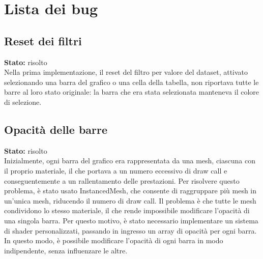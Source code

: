 \section{Lista dei bug}
\subsection{Reset dei filtri}
\textbf{Stato:} risolto\\
Nella prima implementazione, il reset del filtro per valore del dataset,
attivato selezionando una barra del grafico o una cella della tabella,
non riportava tutte le barre al loro stato originale: la barra che era
stata selezionata manteneva il colore di selezione.

\subsection{Opacità delle barre}
\textbf{Stato:} risolto\\
Inizialmente, ogni barra del grafico era rappresentata da una mesh, ciascuna
con il proprio materiale, il che portava a un numero eccessivo di draw call e
conseguentemente a un rallentamento delle prestazioni. 
Per risolvere questo problema, è stato usato InstancedMesh, che consente di
raggruppare più mesh in un'unica mesh, riducendo il numero di draw call.
Il problema è che tutte le mesh condividono lo stesso materiale, il che rende
impossibile modificare l'opacità di una singola barra. Per questo motivo,
è stato necessario implementare un sistema di shader personalizzati, passando
in ingresso un array di opacità per ogni barra. In questo modo, è possibile
modificare l'opacità di ogni barra in modo indipendente, senza influenzare le altre.

